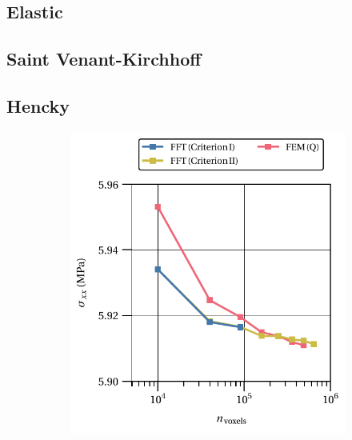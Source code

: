 \subsection{Elastic}

\subsection{Saint Venant-Kirchhoff}

\subsection{Hencky}

\begin{figure}[hbt]
\centering
	\begin{subfigure}[b]{0.49\textwidth}
    \centering
    \includegraphics[width=\textwidth]{figures/von_mises_small_strain_2D_normal_homo_stress_11_vs_n_voxels}
    \caption{}
    \label{subfig:hencky_2D_normal_homo_stress_12_vs_n_voxels}
  \end{subfigure}
  \begin{subfigure}[b]{0.49\textwidth}
    \centering

\end{subfigure}
\end{figure}
